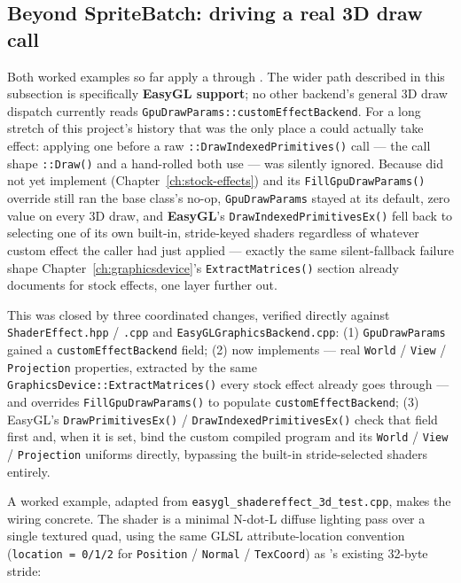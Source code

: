 \subsection{Beyond SpriteBatch: driving a real 3D draw call}

Both worked examples so far apply a  through
. The wider path described in this subsection is specifically
\textbf{EasyGL support}; no other backend's general 3D draw dispatch currently reads
\texttt{GpuDrawParams::customEffectBackend}. For a long stretch of this project's history that was the only
place a  could actually take effect: applying one before a raw
\allowbreak\texttt{::DrawIndexedPrimitives()} call --- the call
shape \allowbreak\texttt{::Draw()} and a hand-rolled
 both use --- was silently ignored. Because
 did not yet implement 
(Chapter~\ref{ch:stock-effects}) and its \texttt{FillGpuDrawParams()} override still ran
the  base class's no-op, \texttt{GpuDrawParams} stayed at its default,
zero value on every 3D draw, and \textbf{EasyGL}'s
\texttt{DrawIndexedPrimitivesEx()} fell back to selecting one of its own built-in,
stride-keyed shaders regardless of whatever custom effect the caller had just applied ---
exactly the same silent-fallback failure shape Chapter~\ref{ch:graphicsdevice}'s
\texttt{ExtractMatrices()} section already documents for stock effects, one layer further
out.

This was closed by three coordinated changes, verified directly against
\texttt{ShaderEffect.hpp} / \texttt{.cpp} and \texttt{EasyGLGraphicsBackend.cpp}: (1)
\texttt{GpuDrawParams} gained a \texttt{customEffectBackend} field; (2)
 now implements  --- real
\texttt{World} / \texttt{View} / \texttt{Projection} properties, extracted by the same
\texttt{GraphicsDevice::ExtractMatrices()} every stock effect already goes through --- and
overrides \texttt{FillGpuDrawParams()} to populate \texttt{customEffectBackend}; (3)
EasyGL's \texttt{DrawPrimitivesEx()} / \texttt{DrawIndexedPrimitivesEx()} check that field
first and, when it is set, bind the custom compiled program and its
\texttt{World} / \texttt{View} / \texttt{Projection} uniforms directly, bypassing the
built-in stride-selected shaders entirely.

A worked example, adapted from \texttt{easygl\_shadereffect\_3d\_test.cpp}, makes the
wiring concrete. The shader is a minimal N-dot-L diffuse lighting pass over a single
textured quad, using the same GLSL attribute-location convention (\texttt{location = 0/1/2}
for \texttt{Position} / \texttt{Normal} / \texttt{TexCoord}) as
's existing 32-byte stride:

